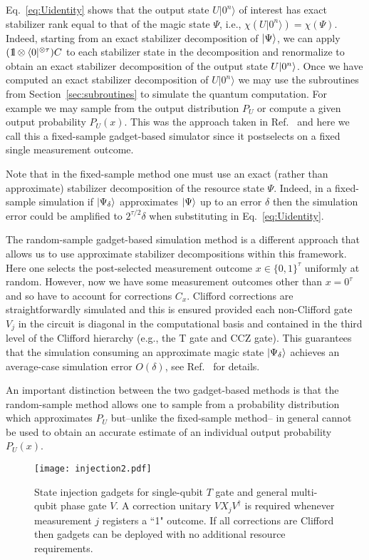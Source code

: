 Eq.~\eqref{eq:Uidentity} shows that the output state $U|0^n\rangle$ of interest has exact stabilizer rank equal to that of the magic state $\Psi$, i.e., $\chi(U|0^n\rangle)=\chi(\Psi)$. Indeed, starting from an exact stabilizer decomposition of $\vert\Psi\rangle$, we can apply $(\id \otimes \bra{0}^{\otimes \tau}) C$ to each stabilizer state in the decomposition and renormalize to obtain an exact stabilizer decomposition of the output state $U\vert0^n \rangle$.  Once we have computed an exact stabilizer decomposition of $U|0^n\rangle$ we may use the subroutines from Section~\ref{sec:subroutines} to simulate the quantum computation. For example we may sample from the output distribution $P_U$ or compute a given output probability $P_U(x)$. This was the approach taken in Ref.~\cite{Bravyi16stabRank} and here we call this a fixed-sample gadget-based simulator since it postselects on a fixed single measurement outcome.

Note that in the fixed-sample method one must use an exact (rather than approximate) stabilizer decomposition of the resource state $\Psi$. Indeed, in a fixed-sample simulation if $\vert\Psi_{\mathrm{\delta}}\rangle$ approximates $\vert\Psi\rangle$ up to an error $\delta$ then the simulation error could be amplified to $2^{\tau/2} \delta$ when substituting in Eq.~\eqref{eq:Uidentity}.  

The random-sample gadget-based simulation method is a different approach that allows us to use approximate stabilizer decompositions within this framework. Here one selects the post-selected measurement outcome $x\in \{0,1\}^\tau$ uniformly at random.  However, now  we have some measurement outcomes other than $x = 0^\tau$ and so have to account for corrections $C_x$.  Clifford corrections are straightforwardly simulated and this is ensured provided each non-Clifford gate $V_j$ in the circuit is diagonal in the computational basis and contained in the third level of the Clifford hierarchy (e.g., the T gate and CCZ gate). This guarantees that the simulation consuming an approximate magic state $|\Psi_\delta\rangle$ achieves an average-case simulation error $O(\delta)$, see Ref.~\cite{bravyi2016improved} for details. 

An important distinction between the two gadget-based methods is that the random-sample method allows one to sample from a probability distribution which approximates $P_U$ but--unlike the fixed-sample method-- in general cannot be used to obtain an accurate estimate of an individual output probability $P_U(x)$. 


\begin{figure}
	\centering
	\texttt{[image: injection2.pdf]}
	\caption{State injection gadgets for single-qubit $T$ gate and general multi-qubit phase gate $V$.  A correction unitary $V X_j V^\dagger$ is required whenever measurement $j$ registers a ``1" outcome.  If all corrections are Clifford then gadgets can be deployed with no additional resource requirements.}
	\label{fig_injection}
\end{figure}

